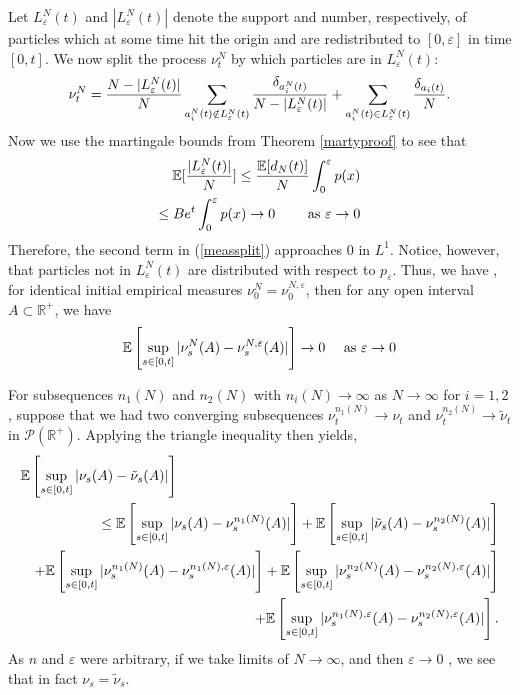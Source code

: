 Let $L^N_\varepsilon(t)$ and $|L^N_\varepsilon(t)|$ denote the support and number, respectively,  of particles which at some time hit the origin and are redistributed to $[0,\varepsilon]$ in time $[0,t]$. We now split the process $\nu^N_t$ by which   particles are in $L^N_\varepsilon(t):$
   \begin{equation}\label{meassplit}
  \nu_t^N =\frac{N-|L_\varepsilon^N(t)|}{N} \sum_{a_i^{N}(t) \notin L_\varepsilon^N(t)}\frac{\delta_{a_i^N(t)}}{N-|L_\varepsilon^N(t)|}+ \sum_{a_i^{N}(t) \in L_\varepsilon^N(t)}\frac{\delta_{a_i(t)}}{N}.\\ \end{equation}
Now we use the martingale bounds from Theorem \ref{martyproof} to see that
\begin{eqnarray}
  \mathbb{E}[\frac{|L_\varepsilon^N(t)|}{N}]\le \frac{\mathbb{E}[d_N(t)]}{N}
\int_0^\varepsilon p(x)\\\le  Be^t \int_0^\varepsilon p(x) \rightarrow 0 \quad   \quad \hbox{ as }\varepsilon\rightarrow 0\nonumber
\end{eqnarray}
 Therefore, the second term in (\ref{meassplit}) approaches 0 in $L^1$. Notice, however, that particles not in $L_\varepsilon^N(t)$ are distributed with respect to  $p_\varepsilon$. Thus, we have , for identical initial empirical measures $\nu_0^N =\nu_0^{N, \varepsilon}$, then for any open interval $A \subset \mathbb{R}^+$, we have
\begin{equation}
\mathbb{E}\left[\sup_{s \in [0,t]}| \nu^N_s(A)- \nu_s^{N,\varepsilon}(A)|\right] \rightarrow 0 \quad \hbox{ as } \varepsilon \rightarrow 0
\end{equation}

For subsequences $n_1(N)$ and $n_2(N)$ with $n_i(N)\rightarrow \infty$ as $N\rightarrow \infty$ for $i = 1,2$, suppose that we had two converging subsequences $\nu^{n_1(N)}_t\rightarrow  \nu_t$ and $\nu_t^{n_2(N)}\rightarrow \tilde \nu_t$ in $\mathcal P(\mathbb{R}^+)$. Applying the triangle inequality then yields, 
 \begin{eqnarray}
 \lefteqn{\mathbb{E}\left[\sup_{s \in [0,t]}|\nu_s(A)-\tilde \nu_s(A)|\right]}\\
 &&\le \mathbb{E}\left[\sup_{s \in [0,t]}|\nu_s(A)- \nu_s^{n_1(N)}(A)|\right]+\mathbb{E}\left[\sup_{s \in [0,t]}|\tilde \nu_s(A)- \nu_s^{n_2(N)}(A)|\right]\nonumber\\
&&+\mathbb{E}\left[\sup_{s \in [0,t]}|\nu_s^{n_1(N)}(A)-\nu_s^{n_1(N),\varepsilon}(A) |\right]+\mathbb{E}\left[\sup_{s \in [0,t]}|\nu_s^{n_2(N)}(A)-\nu_s^{n_2(N),\varepsilon}(A) |\right] \nonumber\\
&&+\mathbb{E}\left[\sup_{s \in [0,t]}| \nu_s^{n_1(N),\varepsilon}(A)-\nu_s^{n_2(N),\varepsilon}(A) |\right]. \nonumber
\end{eqnarray} 
   As $n$ and $\varepsilon$ were arbitrary, if we take limits of $N \rightarrow \infty$, and then $\varepsilon \rightarrow 0$ , we see that in fact $\nu_s = \tilde \nu_s$. 








